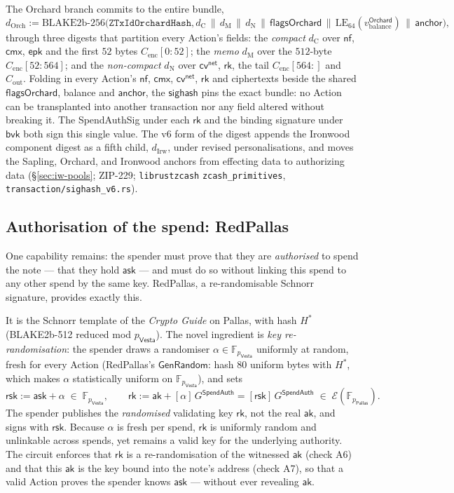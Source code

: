 \documentclass[11pt,a4paper]{article}
\theoremstyle{definition}
\newcommand{\F}{\mathbb{F}}
\newcommand{\nfsym}{\mathsf{nf}}
\newcommand{\cmx}{\mathsf{cmx}}
\newcommand{\cvsym}{\mathsf{cv}}
\newcommand{\rk}{\mathsf{rk}}
\newcommand{\Pallas}{\ensuremath{\mathsf{Pallas}}}
\newcommand{\Vesta}{\ensuremath{\mathsf{Vesta}}}
\newcommand{\Ep}{\ensuremath{\mathcal{E}}}
\newcommand{\ask}{\ensuremath{\mathsf{ask}}}
\newcommand{\aksym}{\ensuremath{\mathsf{ak}}}
\newcommand{\rsk}{\ensuremath{\mathsf{rsk}}}
\begin{document}
The Orchard branch commits to the entire bundle,
\[
d_{\mathrm{Orch}} := \mathrm{BLAKE2b\text{-}256}\bigl(\texttt{ZTxIdOrchardHash}, d_{\mathrm{C}} \,\|\, d_{\mathrm{M}} \,\|\, d_{\mathrm{N}} \,\|\, \mathsf{flagsOrchard} \,\|\, \mathrm{LE}_{64}(v_{\mathrm{balance}}^{\mathsf{Orchard}}) \,\|\, \mathsf{anchor}\bigr),
\]
through three digests that partition every Action's fields: the \emph{compact}
$d_{\mathrm{C}}$ over $\nfsym$, $\cmx$, $\mathsf{epk}$ and the first $52$ bytes
$C_{\mathrm{enc}}[0{:}52]$; the \emph{memo} $d_{\mathrm{M}}$ over the $512$-byte
$C_{\mathrm{enc}}[52{:}564]$; and the \emph{non-compact} $d_{\mathrm{N}}$ over
$\cvsym^{\mathsf{net}}$, $\rk$, the tail $C_{\mathrm{enc}}[564{:}]$ and
$C_{\mathrm{out}}$. Folding in every Action's $\nfsym$, $\cmx$,
$\cvsym^{\mathsf{net}}$, $\rk$ and ciphertexts beside the shared
$\mathsf{flagsOrchard}$, balance and $\mathsf{anchor}$, the $\mathsf{sighash}$
pins the exact bundle: no Action can be transplanted into another transaction
nor any field altered without breaking it. The SpendAuthSig under each $\rk$
and the binding signature under $\mathsf{bvk}$ both sign this single value.
The v6 form of the digest appends the Ironwood component digest as a fifth
child, $d_{\mathrm{Irw}}$, under revised personalisations, and moves the
Sapling, Orchard, and Ironwood anchors from effecting data to authorizing
data (\S\ref{sec:iw-pools}; ZIP-229; \texttt{librustzcash}
\texttt{zcash\_primitives}, \texttt{transaction/sighash\_v6.rs}).

\subsection{Authorisation of the spend: RedPallas}\label{sec:redpallas}

One capability remains: the spender must prove that they are \emph{authorised}
to spend the note --- that they hold $\ask$ --- and must do so without
linking this spend to any other spend by the same key. RedPallas, a
re-randomisable Schnorr signature, provides exactly this.

It is the Schnorr template of the \emph{Crypto Guide} on Pallas, with hash
$H^*$ (BLAKE2b-512 reduced mod $p_{\Vesta}$). The novel ingredient is
\emph{key re-randomisation}: the spender draws a randomiser
$\alpha \in \F_{p_{\Vesta}}$ uniformly at random, fresh for every Action
(RedPallas's $\mathsf{GenRandom}$: hash $80$ uniform bytes with $H^*$, which
makes $\alpha$ statistically uniform on $\F_{p_{\Vesta}}$), and sets
\[
\rsk := \ask + \alpha \;\in\; \F_{p_{\Vesta}}, \qquad \rk := \aksym + [\alpha]\,G^{\mathsf{SpendAuth}} = [\rsk]\,G^{\mathsf{SpendAuth}} \;\in\; \Ep(\F_{p_{\Pallas}}).
\]
The spender publishes the \emph{randomised} validating key $\rk$, not the
real $\aksym$, and signs with $\rsk$. Because $\alpha$ is fresh per spend,
$\rk$ is uniformly random and unlinkable across spends, yet remains a valid
key for the underlying authority. The circuit enforces that
$\rk$ is a re-randomisation of the witnessed $\aksym$ (check A6) and that
this $\aksym$ is the key bound into the note's address (check A7),
so that a valid Action proves the spender knows $\ask$ --- without ever
revealing $\aksym$.
\end{document}
